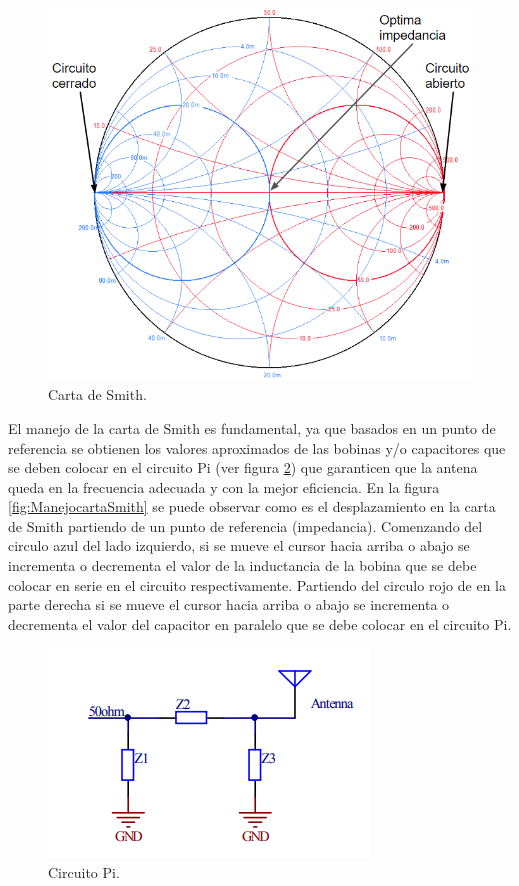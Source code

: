 \begin{figure}[H]
	\centering
	\includegraphics[scale=.45]{./Figures/CartaSmith.PNG}
	\caption{Carta de Smith.}
	\label{fig:CartaSmith}
\end{figure}
El manejo de la carta de Smith es fundamental, ya que basados en un punto de referencia se obtienen los valores aproximados de las bobinas y/o capacitores que se deben colocar en el circuito Pi (ver figura \ref{fig:cxPI}) que garanticen que la antena queda en la frecuencia adecuada y con la mejor eficiencia.
En la figura \ref{fig:ManejocartaSmith}  se puede observar como es el desplazamiento en la carta de Smith partiendo de un punto de referencia (impedancia). Comenzando del circulo azul del lado izquierdo, si se mueve el cursor hacia arriba o abajo se incrementa o decrementa el valor de la inductancia de la bobina que se debe colocar en serie en el circuito respectivamente. Partiendo del circulo rojo de en la parte derecha si se mueve el cursor hacia arriba o abajo se incrementa o decrementa el valor del capacitor en paralelo que se  debe colocar en el circuito Pi.

\begin{figure}[H]
	\centering
	\includegraphics[scale=.65]{./Figures/cxPI.PNG}
	\caption{Circuito Pi\citep{NordicSemiconductor2012}.}
	\label{fig:cxPI}
\end{figure}

